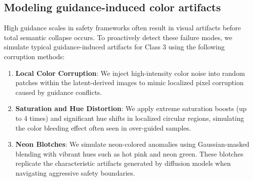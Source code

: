 \subsection{Modeling guidance-induced color artifacts}
High guidance scales in safety frameworks often result in visual artifacts before total semantic collapse occurs. To proactively detect these failure modes, we simulate typical guidance-induced artifacts for Class 3 using the following corruption methods:

\begin{enumerate}
    \item \textbf{Local Color Corruption}: We inject high-intensity color noise into random patches within the latent-derived images to mimic localized pixel corruption caused by guidance conflicts.
    \item \textbf{Saturation and Hue Distortion}: We apply extreme saturation boosts (up to 4 times) and significant hue shifts in localized circular regions, simulating the color bleeding effect often seen in over-guided samples.
    \item \textbf{Neon Blotches}: We simulate neon-colored anomalies using Gaussian-masked blending with vibrant hues such as hot pink and neon green. These blotches replicate the characteristic artifacts generated by diffusion models when navigating aggressive safety boundaries.
\end{enumerate}


